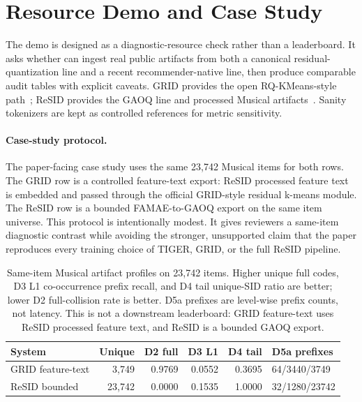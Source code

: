 \section{Resource Demo and Case Study}

The demo is designed as a diagnostic-resource check rather than a leaderboard.
It asks whether \tool can ingest real public \sid artifacts from both a
canonical residual-quantization line and a recent recommender-native line, then
produce comparable audit tables with explicit caveats. GRID provides the
open RQ-KMeans-style path~\cite{ju2025grid}; ReSID provides the GAOQ line and
processed Musical artifacts~\cite{liang2026resid}. Sanity tokenizers are kept
as controlled references for metric sensitivity.

\paragraph{Case-study protocol.}
The paper-facing case study uses the same 23,742 Musical items for both rows.
The GRID row is a controlled feature-text export: ReSID processed feature text
is embedded and passed through the official GRID-style residual k-means module.
The ReSID row is a bounded FAMAE-to-GAOQ export on the same item universe. This
protocol is intentionally modest. It gives reviewers a same-item diagnostic
contrast while avoiding the stronger, unsupported claim that the paper
reproduces every training choice of TIGER, GRID, or the full ReSID pipeline.

\begin{table}[t]
\caption{Same-item Musical artifact profiles on 23,742 items. Higher unique
full codes, D3 L1 co-occurrence prefix recall, and D4 tail unique-SID ratio are
better; lower D2 full-collision rate is better. D5a prefixes are level-wise
prefix counts, not latency. This is not a downstream leaderboard: GRID
feature-text uses ReSID processed feature text, and ReSID is a bounded GAOQ
export.}
\label{tab:musical-diagnostic}
\small
\setlength{\tabcolsep}{2.0pt}
\begin{tabular}{@{}lrrrrl@{}}
\toprule
System & Unique & D2 full & D3 L1 & D4 tail & D5a prefixes \\
\midrule
GRID feature-text & 3,749 & 0.9769 & 0.0552 & 0.3695 & 64/3440/3749 \\
ReSID bounded & 23,742 & 0.0000 & 0.1535 & 1.0000 & 32/1280/23742 \\
\bottomrule
\end{tabular}
\end{table}

